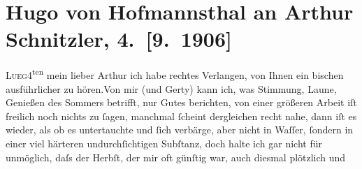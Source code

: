 

         
         \renewcommand{\erwaehntePersonen}{Personen: Otto Brahm, Gertrude von Hofmannsthal, Christiane von Hofmannsthal, Raimund von Hofmannsthal, Franz von Hofmannsthal}
         \renewcommand{\erwaehnteOrte}{Orte: Lueg am Wolfgangsee, Rodaun, Semmering, St. Gilgen, Wien}
         \renewcommand{\erwaehnteWerke}{}
               \section[Hugo von Hofmannsthal an Arthur Schnitzler, 4. {[}9. 1906{]}]{ Hugo von Hofmannsthal an Arthur Schnitzler,
               4. {[}9. 1906{]}}\nopagebreak{}\rehead{ }\begin{ledgroupsized}[t]{13cm}\normalsize\beginnumbering \toendnotes[C]{\smallbreak\pagebreak[2]} 
\toendnotes[C]{\smallbreak}\pstart
           \raggedleft{}{\pb}\textsc{Lueg}4\textsuperscript{ten}\pend
           \pstart{}mein lieber Arthur \pend\pstart
           ich habe rechtes Verlangen, von Ihnen ein bischen ausführlicher zu hören.\hspace*{1.5em}Von mir (und Gerty)
               kann ich, was Stimmung, Laune, Genießen des Sommers betrifft, nur Gutes berichten,
               von einer größeren Arbeit iſt freilich noch nichts zu ſagen, manchmal {\pb}ſcheint dergleichen recht nahe,
               dann iſt es wieder, als ob es untertauchte und ſich verbärge, aber nicht in Waſſer,
               ſondern in einer viel härteren undurchſichtigen Subſtanz, doch halte ich gar nicht
               für unmöglich, daſs der Herbſt, der mir oft günſtig war, auch diesmal plötzlich und

\end{ledgroupsized}
